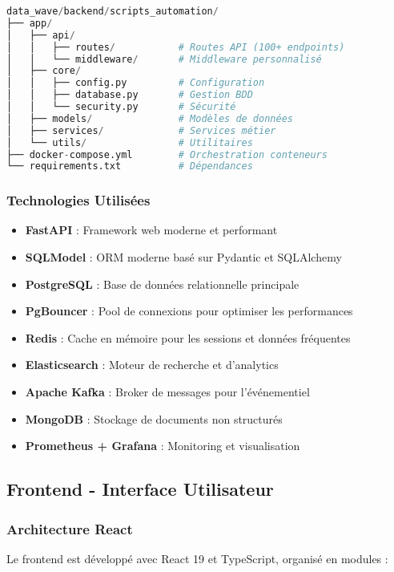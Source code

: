 \documentclass[12pt,a4paper]{article}
\begin{document}
\begin{lstlisting}[language=Python, caption=Structure du backend]
data_wave/backend/scripts_automation/
├── app/
│   ├── api/
│   │   ├── routes/           # Routes API (100+ endpoints)
│   │   └── middleware/       # Middleware personnalisé
│   ├── core/
│   │   ├── config.py         # Configuration
│   │   ├── database.py       # Gestion BDD
│   │   └── security.py       # Sécurité
│   ├── models/               # Modèles de données
│   ├── services/             # Services métier
│   └── utils/                # Utilitaires
├── docker-compose.yml        # Orchestration conteneurs
└── requirements.txt          # Dépendances
\end{lstlisting}

\subsubsection{Technologies Utilisées}

\begin{itemize}
    \item \textbf{FastAPI} : Framework web moderne et performant
    \item \textbf{SQLModel} : ORM moderne basé sur Pydantic et SQLAlchemy
    \item \textbf{PostgreSQL} : Base de données relationnelle principale
    \item \textbf{PgBouncer} : Pool de connexions pour optimiser les performances
    \item \textbf{Redis} : Cache en mémoire pour les sessions et données fréquentes
    \item \textbf{Elasticsearch} : Moteur de recherche et d'analytics
    \item \textbf{Apache Kafka} : Broker de messages pour l'événementiel
    \item \textbf{MongoDB} : Stockage de documents non structurés
    \item \textbf{Prometheus + Grafana} : Monitoring et visualisation
\end{itemize}

\subsection{Frontend - Interface Utilisateur}

\subsubsection{Architecture React}
Le frontend est développé avec React 19 et TypeScript, organisé en modules :
\end{document}
